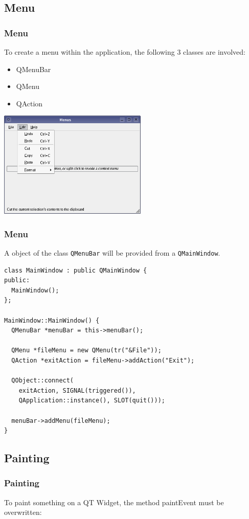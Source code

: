 \subsection{Menu}
\begin{frame}[fragile]
\frametitle{Menu}
To create a menu within the application, the following 3 classes are
involved:
\begin{itemize}
\item QMenuBar
\item QMenu
\item QAction
\end{itemize}
\includegraphics[width=200pt]{img/menus-example.png}
\end{frame}

\begin{frame}[fragile]
\frametitle{Menu}
A object of the class \verb|QMenuBar| will be provided from a \verb|QMainWindow|.
{\tiny
\begin{lstlisting}
class MainWindow : public QMainWindow {
public:
  MainWindow();
};

MainWindow::MainWindow() {
  QMenuBar *menuBar = this->menuBar();
  
  QMenu *fileMenu = new QMenu(tr("&File"));
  QAction *exitAction = fileMenu->addAction("Exit");

  QObject::connect(
    exitAction, SIGNAL(triggered()),
    QApplication::instance(), SLOT(quit()));

  menuBar->addMenu(fileMenu);
}
\end{lstlisting}
}
\end{frame}


\subsection{Painting}
\begin{frame}[fragile]
\frametitle{Painting}
To paint something on a QT Widget, the method paintEvent must be overwritten:

\end{frame}


